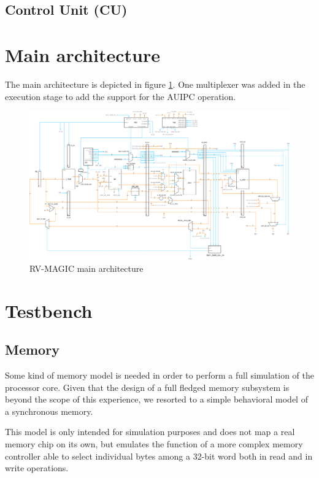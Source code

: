 \documentclass[a4paper]{article}
\begin{document}
\subsection{Control Unit (CU)}

\section{Main architecture}
The main architecture is depicted in figure \ref{fig:rv-magic_main}. One multiplexer was added in the execution stage to add the support for the AUIPC operation.

\begin{figure}[hbtp]
	\centering
    \includegraphics[scale=0.2]{../main/ref/schematic/rvMagic.png}
    \caption{RV-MAGIC main architecture}
    \label{fig:rv-magic_main}
\end{figure}

\section{Testbench}
\subsection{Memory}\label{sec:memory}
Some kind of memory model is needed in order to perform a full simulation of the processor core. Given that the design of a full fledged memory subsystem is beyond the scope of this experience, we resorted to a simple behavioral model of a synchronous memory.

This model is only intended for simulation purposes and does not map a real memory chip on its own, but emulates the function of a more complex memory controller able to select individual bytes among a 32-bit word both in read and in write operations.
\end{document}
